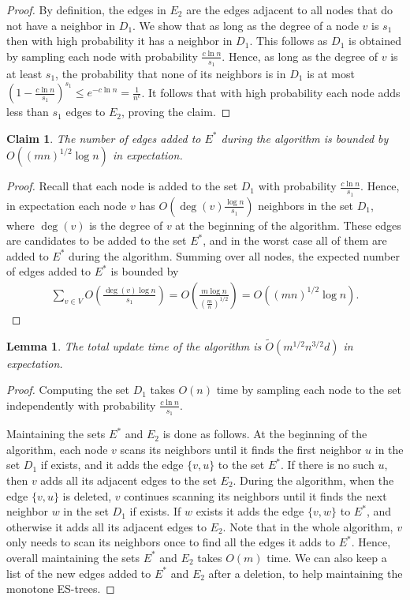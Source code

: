 \documentclass[11pt]{article}
\newtheorem{lemma}[theorem]{Lemma}
\newtheorem{claim}[theorem]{Claim}
\theoremstyle{definition}
\theoremstyle{remark}
\begin{document}
\begin{titlepage}
\begin{proof}
By definition, the edges in $E_2$ are the edges adjacent to all nodes that do not have a neighbor in $D_1$. We show that as long as the degree of a node $v$ is $s_1$ then with high probability it has a neighbor in $D_1$. This follows as $D_1$ is obtained by sampling each node with probability $\frac{c \ln{n}}{s_1}$. Hence, as long as the degree of $v$ is at least $s_1$, the probability that none of its neighbors is in $D_1$ is at most $(1-\frac{c\ln{n}}{s_1})^{s_1} \leq e^{-c\ln{n}}=\frac{1}{n^c}$. It follows that with high probability each node adds less than $s_1$ edges to $E_2$, proving the claim.
\end{proof}

\begin{claim} \label{claim_warmup_E*}
The number of edges added to $E^*$ during the algorithm is bounded by $O( (mn)^{1/2}\log{n} )$ in expectation.
\end{claim}

\begin{proof}
Recall that each node is added to the set $D_1$ with probability $\frac{c \ln{n}}{s_1}$. Hence, in expectation each node $v$ has $O(\deg(v) \frac{\log{n}}{s_1})$ neighbors in the set $D_1$, where $\deg(v)$ is the degree of $v$ at the beginning of the algorithm. These edges are candidates to be added to the set $E^*$, and in the worst case all of them are added to $E^*$ during the algorithm. Summing over all nodes, the expected number of edges added to $E^*$ is bounded by 
\begin{align*}
    \sum_{v \in V} O \left( \frac{\deg(v)\log{n}}{s_1} \right) = O \left( \frac{m\log{n}}{(\frac{m}{n})^{1/2}} \right) = O( (mn)^{1/2}\log{n} ).
\end{align*} 
\end{proof}

\begin{lemma}
The total update time of the algorithm is $\tilde{O}(m^{1/2}n^{3/2}d)$ in expectation.
\end{lemma}

\begin{proof}
Computing the set $D_1$ takes $O(n)$ time by sampling each node to the set independently with probability $\frac{c \ln{n}}{s_1}$. 

Maintaining the sets $E^*$ and $E_2$ is done as follows. At the beginning of the algorithm, each node $v$ scans its neighbors until it finds the first neighbor $u$ in the set $D_1$ if exists, and it adds the edge $\{v,u\}$ to the set $E^*$. If there is no such $u$, then $v$ adds all its adjacent edges to the set $E_2$.
During the algorithm, when the edge $\{v,u\}$ is deleted, $v$ continues scanning its neighbors until it finds the next neighbor $w$ in the set $D_1$ if exists. If $w$ exists it adds the edge $\{v,w\}$ to $E^*$, and otherwise it adds all its adjacent edges to $E_2$. Note that in the whole algorithm, $v$ only needs to scan its neighbors once to find all the edges it adds to $E^*$. Hence, overall maintaining the sets $E^*$ and $E_2$ takes $O(m)$ time. We can also keep a list of the new edges added to $E^*$ and $E_2$ after a deletion, to help maintaining the monotone ES-trees.


\end{proof}
\end{titlepage}
\end{document}
